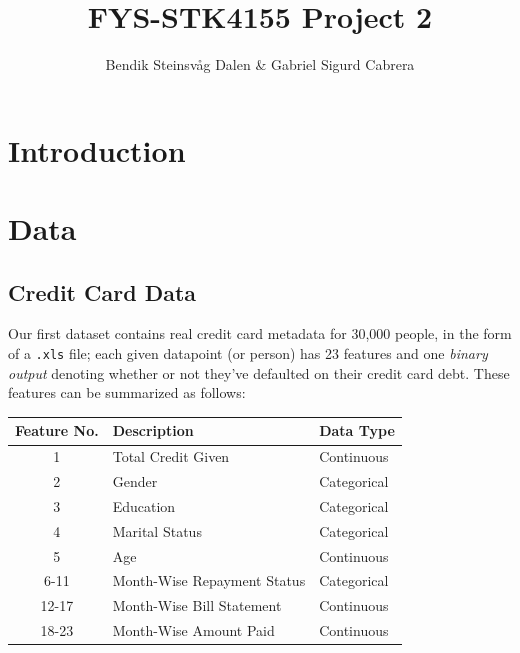 \documentclass[a4paper,10pt,english]{article}
\begin{document}
\title{FYS-STK4155 Project 2}
\author{Bendik Steinsvåg Dalen \& Gabriel Sigurd Cabrera}

\maketitle
\begin{abstract}
\end{abstract}

\begin{multicols*}{2}

\section*{Introduction}
\label{sec:introduction}

\section*{Data}
\label{sec:data}

\subsection*{Credit Card Data}

Our first dataset contains real credit card metadata for 30,000 people, in the form of a \texttt{.xls} file; each given datapoint (or person) has 23 features and one \textit{binary output} denoting whether or not they've defaulted on their credit card debt.  These features can be summarized as follows:

\begin{table}[H]
\center
\small
\begin{tabular}{c l l}
Feature No. & Description & Data Type\\
\hline
1 & Total Credit Given & Continuous\\
2 & Gender & Categorical\\
3 & Education & Categorical\\
4 & Marital Status & Categorical\\
5 & Age & Continuous\\
6-11 & Month-Wise Repayment Status & Categorical\\
12-17 & Month-Wise Bill Statement & Continuous\\
18-23 & Month-Wise Amount Paid & Continuous
\end{tabular}
\end{table}


\end{multicols*}
\end{document}

